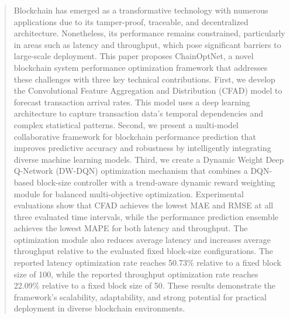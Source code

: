 \documentclass[a4paper,fleqn]{cas-dc}
\begin{document}
	
	
	\begin{abstract}
		Blockchain has emerged as a transformative technology with numerous applications due to its tamper-proof, traceable, and decentralized architecture. Nonetheless, its performance remains constrained, particularly in areas such as latency and throughput, which pose significant barriers to large-scale deployment. This paper proposes ChainOptNet, a novel blockchain system performance optimization framework that addresses these challenges with three key technical contributions. First, we develop the Convolutional Feature Aggregation and Distribution (CFAD) model to forecast transaction arrival rates. This model uses a deep learning architecture to capture transaction data's temporal dependencies and complex statistical patterns. Second, we present a multi-model collaborative framework for blockchain performance prediction that improves predictive accuracy and robustness by intelligently integrating diverse machine learning models. Third, we create a Dynamic Weight Deep Q-Network (DW-DQN) optimization mechanism that combines a DQN-based block-size controller with a trend-aware dynamic reward weighting module for balanced multi-objective optimization. 
		Experimental evaluations show that CFAD achieves the lowest MAE and RMSE at all three evaluated time intervals, while the performance prediction ensemble achieves the lowest MAPE for both latency and throughput. The optimization module also reduces average latency and increases average throughput relative to the evaluated fixed block-size configurations.
		The reported latency optimization rate reaches 50.73\% relative to a fixed block size of 100, while the reported throughput optimization rate reaches 22.09\% relative to a fixed block size of 50. These results demonstrate the framework's scalability, adaptability, and strong potential for practical deployment in diverse blockchain environments.
	\end{abstract}
	
	
	
\end{document}

